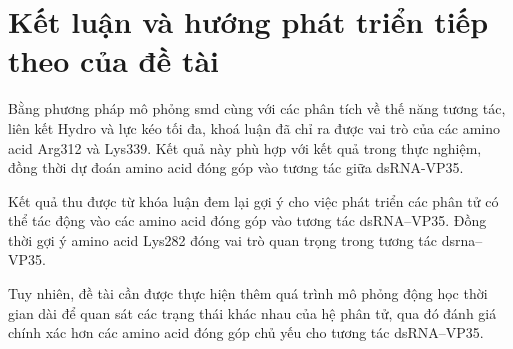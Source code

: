 \documentclass[12pt,a4paper,reqno, oneside]{book}
\begin{document}
%
%
%
%


\newpage
\pagestyle{fancy}
\setcounter{chapter}{3}
\chapter{Kết luận và hướng phát triển tiếp theo của đề tài}

	
	Bằng phương pháp mô phỏng \gls{smd} cùng với các phân tích về thế năng tương tác, liên kết Hydro và lực kéo tối đa, khoá luận đã chỉ ra được vai trò của các amino acid Arg312 và Lys339. Kết quả này phù hợp với kết quả trong thực nghiệm, đồng thời dự đoán amino acid đóng góp vào tương tác giữa dsRNA-VP35.

	Kết quả thu được từ khóa luận đem lại gợi ý cho việc phát triển các phân tử có thể tác động vào các amino acid đóng góp vào tương tác dsRNA--VP35. Đồng thời gợi ý amino acid Lys282 đóng vai trò quan trọng trong tương tác \gls{dsrna}--VP35.
	
	Tuy nhiên, đề tài cần được thực hiện thêm quá trình mô phỏng động học thời gian dài để quan sát các trạng thái khác nhau của hệ phân tử, qua đó đánh giá chính xác hơn các amino acid đóng góp chủ yếu cho tương tác dsRNA--VP35.
	
\end{document}
